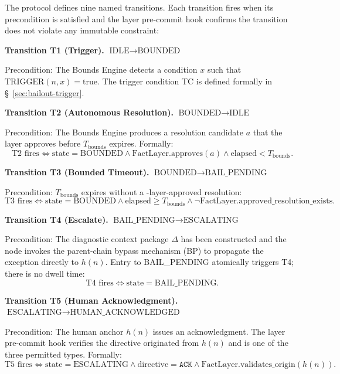 The protocol defines nine named transitions. Each transition fires when its precondition is satisfied and the \fact{} layer pre-commit hook confirms the transition does not violate any immutable constraint:

\bigskip
\noindent\textbf{Transition T1 (Trigger).} $\text{IDLE} \rightarrow \text{BOUNDED}$

Precondition: The Bounds Engine detects a condition $x$ such that $\text{TRIGGER}(n, x) = \text{true}$. The trigger condition TC is defined formally in \S~\ref{sec:bailout-trigger}.

\bigskip
\noindent\textbf{Transition T2 (Autonomous Resolution).} $\text{BOUNDED} \rightarrow \text{IDLE}$

Precondition: The Bounds Engine produces a resolution candidate $a$ that the \fact{} layer approves before $T_{\text{bounds}}$ expires. Formally:
\begin{equation}
\text{T2 fires} \iff \text{state} = \text{BOUNDED} \land \text{FactLayer.approves}(a) \land \text{elapsed} < T_{\text{bounds}}. \tag{T2}
\end{equation}

\bigskip
\noindent\textbf{Transition T3 (Bounded Timeout).} $\text{BOUNDED} \rightarrow \text{BAIL\_PENDING}$

Precondition: $T_{\text{bounds}}$ expires without a \fact-layer-approved resolution:
\begin{equation}
\text{T3 fires} \iff \text{state} = \text{BOUNDED} \land \text{elapsed} \geq T_{\text{bounds}} \land \neg\text{FactLayer.approved\_resolution\_exists}. \tag{T3}
\end{equation}

\bigskip
\noindent\textbf{Transition T4 (Escalate).} $\text{BAIL\_PENDING} \rightarrow \text{ESCALATING}$

Precondition: The diagnostic context package $\Delta$ has been constructed and the node invokes the parent-chain bypass mechanism (BP) to propagate the exception directly to $h(n)$. Entry to BAIL\_PENDING atomically triggers T4; there is no dwell time:
\begin{equation}
\text{T4 fires} \iff \text{state} = \text{BAIL\_PENDING}. \tag{T4}
\end{equation}

\bigskip
\noindent\textbf{Transition T5 (Human Acknowledgment).} $\text{ESCALATING} \rightarrow \text{HUMAN\_ACKNOWLEDGED}$

Precondition: The human anchor $h(n)$ issues an acknowledgment. The \fact{} layer pre-commit hook verifies the directive originated from $h(n)$ and is one of the three permitted types. Formally:
\begin{equation}
\text{T5 fires} \iff \text{state} = \text{ESCALATING} \land \text{directive} = \texttt{ACK} \land \text{FactLayer.validates\_origin}(h(n)). \tag{T5}
\end{equation}

